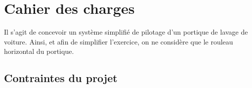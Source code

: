 \section{Cahier des charges}

Il s'agit de concevoir un système simplifié de pilotage d'un portique de lavage de voiture. 
Ainsi, et afin de simplifier l'exercice, on ne considère que le rouleau horizontal du portique.

\subsection{Contraintes du projet}


